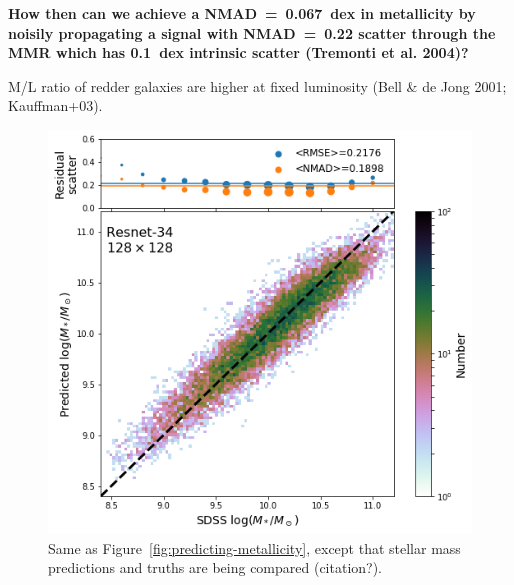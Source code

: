 \documentclass[fleqn,usenatbib]{mnras}
\begin{document}
\textbf{How then can we achieve a NMAD~=~0.067~dex in metallicity by noisily propagating a signal with NMAD~=~0.22 scatter through the MMR which has 0.1~dex intrinsic scatter (Tremonti et al. 2004)?}

M/L ratio of redder galaxies are higher at fixed luminosity (Bell \& de Jong 2001; Kauffman+03).


\begin{figure}
	\includegraphics[width=\columnwidth]{predicted-vs-true-mass.png}
	\caption{\label{fig:predicting-mass}
		Same as Figure~\ref{fig:predicting-metallicity}, except that stellar mass predictions and truths are being compared (citation?).}
\end{figure}




\end{document}
